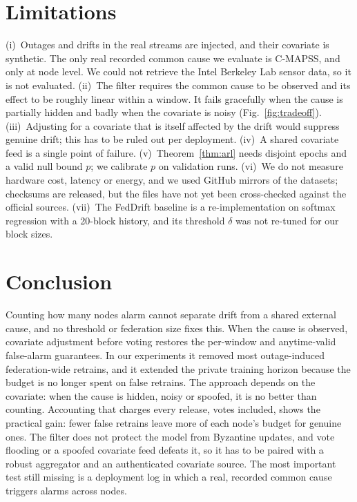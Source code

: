 \IfFileExists{IEEEtran.cls}{\documentclass[journal]{IEEEtran}\newcommand{\ieeemode}{}}{\documentclass[10pt,twocolumn,letterpaper]{article}\usepackage[margin=0.72in,columnsep=0.22in]{geometry}}
\begin{document}
\section{Limitations}\label{sec:limits}
\noindent (i)~Outages and drifts in the real streams are injected, and their covariate is synthetic. The only real recorded common cause we evaluate is C-MAPSS, and only at node level. We could not retrieve the Intel Berkeley Lab sensor data, so it is not evaluated. (ii)~The filter requires the common cause to be observed and its effect to be roughly linear within a window. It fails gracefully when the cause is partially hidden and badly when the covariate is noisy (Fig.~\ref{fig:tradeoff}). (iii)~Adjusting for a covariate that is itself affected by the drift would suppress genuine drift; this has to be ruled out per deployment. (iv)~A shared covariate feed is a single point of failure. (v)~Theorem~\ref{thm:arl} needs disjoint epochs and a valid null bound $p$; we calibrate $p$ on validation runs. (vi)~We do not measure hardware cost, latency or energy, and we used GitHub mirrors of the datasets; checksums are released, but the files have not yet been cross-checked against the official sources. (vii)~The FedDrift baseline is a re-implementation on softmax regression with a 20-block history, and its threshold $\delta$ was not re-tuned for our block sizes.

\section{Conclusion}\label{sec:conclusion}
Counting how many nodes alarm cannot separate drift from a shared external cause, and no threshold or federation size fixes this. When the cause is observed, covariate adjustment before voting restores the per-window and anytime-valid false-alarm guarantees. In our experiments it removed most outage-induced federation-wide retrains, and it extended the private training horizon because the budget is no longer spent on false retrains. The approach depends on the covariate: when the cause is hidden, noisy or spoofed, it is no better than counting. Accounting that charges every release, votes included, shows the practical gain: fewer false retrains leave more of each node's budget for genuine ones. The filter does not protect the model from Byzantine updates, and vote flooding or a spoofed covariate feed defeats it, so it has to be paired with a robust aggregator and an authenticated covariate source. The most important test still missing is a deployment log in which a real, recorded common cause triggers alarms across nodes.
\end{document}

